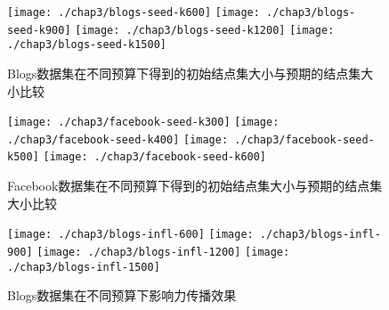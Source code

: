 \begin{figure}[H]
	\centering%
	{\texttt{[image: ./chap3/blogs-seed-k600]}}
	\hspace{3em}%
	{\texttt{[image: ./chap3/blogs-seed-k900]}}
	\hspace{3em}%
	{\texttt{[image: ./chap3/blogs-seed-k1200]}}
	\hspace{3em}%
	{\texttt{[image: ./chap3/blogs-seed-k1500]}}
	\caption{Blogs数据集在不同预算下得到的初始结点集大小与预期的结点集大小比较}
	\label{fig:chap3:blogs-seed}
\end{figure}


\begin{figure}[H]
	\centering%
	{\texttt{[image: ./chap3/facebook-seed-k300]}}
	\hspace{3em}%
	{\texttt{[image: ./chap3/facebook-seed-k400]}}
	\hspace{3em}%
	{\texttt{[image: ./chap3/facebook-seed-k500]}}
	\hspace{3em}%
	{\texttt{[image: ./chap3/facebook-seed-k600]}}
	\caption{Facebook数据集在不同预算下得到的初始结点集大小与预期的结点集大小比较}
	\label{fig:chap3:facebook-seed}
\end{figure}


\begin{figure}[H]
	\centering%
	{\texttt{[image: ./chap3/blogs-infl-600]}}
	\hspace{3em}%
	{\texttt{[image: ./chap3/blogs-infl-900]}}
	\hspace{3em}%
	{\texttt{[image: ./chap3/blogs-infl-1200]}}
	\hspace{3em}%
	{\texttt{[image: ./chap3/blogs-infl-1500]}}
	\caption{Blogs数据集在不同预算下影响力传播效果}
	\label{fig:chap3:blogs-infl}
\end{figure}


